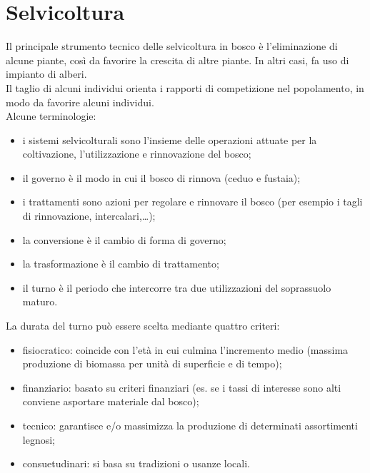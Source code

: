 \documentclass{article}
\begin{document}
\section{Selvicoltura}
Il principale strumento tecnico delle selvicoltura in bosco è l'eliminazione di alcune piante, così da favorire la crescita di altre piante. In altri casi, fa uso di impianto di alberi.\\
Il taglio di alcuni individui orienta i rapporti di competizione nel popolamento, in modo da favorire alcuni individui.\\
Alcune terminologie:
\begin{itemize}
    \item i sistemi selvicolturali sono l'insieme delle operazioni attuate per la coltivazione, l'utilizzazione e rinnovazione del bosco;
    \item il governo è il modo in cui il bosco di rinnova (ceduo e fustaia);
    \item i trattamenti sono azioni per regolare e rinnovare il bosco (per esempio i tagli di rinnovazione, intercalari,\dots);
    \item la conversione è il cambio di forma di governo;
    \item la trasformazione è il cambio di trattamento;
    \item il turno è il periodo che intercorre tra due utilizzazioni del soprassuolo maturo.
\end{itemize}
La durata del turno può essere scelta mediante quattro criteri:
\begin{itemize}
    \item fisiocratico: coincide con l'età in cui culmina l'incremento medio (massima produzione di biomassa per unità di superficie e di tempo);
    \item finanziario: basato su criteri finanziari (es. se i tassi di interesse sono alti conviene asportare materiale dal bosco);
    \item tecnico: garantisce e/o massimizza la produzione di determinati assortimenti legnosi;
    \item consuetudinari: si basa su tradizioni o usanze locali.
\end{itemize}
\end{document}
